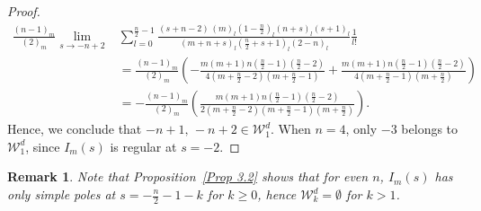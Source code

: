 \documentclass{article}
\theoremstyle{boldremark}
\newtheorem{remark}[theorem]{Remark}
\renewcommand\[{\begin{equation}}
\renewcommand\]{\end{equation}}
\theoremstyle{definition}
\numberwithin{equation}{section}
\begin{document}
\begin{proof}
\begin{align*}
    \frac{(n-1)_m}{(2)_m}\lim_{s \to -n+2} &\sum_{l=0}^{\frac{n}{2}-1} \frac{(s+n-2)\,(m)_l \left(1 - \frac{n}{2}\right)_l (n+s)_l (s+1)_l}{(m + n + s)_l \left(\frac{n}{2} + s + 1\right)_l (2 - n)_l} \frac{1}{l!}\\
     &= \frac{(n-1)_m}{(2)_m}\left(- \frac{m(m+1)n\left(\frac{n}{2}-1\right)\left(\frac{n}{2}-2\right)}{4\left(m+\frac{n}{2}-2\right)\left(m+\frac{n}{2}-1\right)} + \frac{m(m+1)n\left(\frac{n}{2}-1\right)\left(\frac{n}{2}-2\right)}{4\left(m+\frac{n}{2}-1\right)\left(m+\frac{n}{2}\right)}\right)\\
    &= -\frac{(n-1)_m}{(2)_m}\left(\frac{m(m+1)n\left(\frac{n}{2}-1\right)\left(\frac{n}{2}-2\right)}{2\left(m+\frac{n}{2}-2\right)\left(m+\frac{n}{2}-1\right)\left(m+\frac{n}{2}\right)}\right).
\end{align*}
Hence, we conclude that
$
-n+1,\,-n+2 \in \mathcal{W}^d_1.
$
When $n =4$, only $-3$ belongs to $\mathcal{W}_1^d$, since $I_m(s)$ is regular at $s = -2$.
\end{proof}

\begin{remark}
    Note that Proposition~\ref{Prop 3.2} shows that for even $n$, $I_m(s)$ has only simple poles at $s = -\frac{n}{2}-1 - k$ for $k \geq 0$, hence $\mathcal{W}^d_k = \emptyset$ for $k > 1$.
\end{remark}
\end{document}
